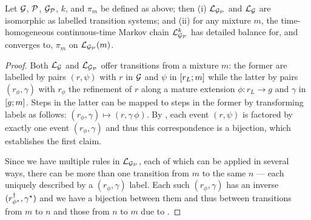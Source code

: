\begin{theorem}
  \label{thm:detailed-balance}
  Let $\mathcal{G}$, $\mathcal{P}$, $\mathcal{G}_{\mathcal{P}}$,
  $k$, and $\pi_m$ be defined as above;
  then (i) $\mathcal{L}_{\mathcal{G}_{\mathcal{P}}}$ and $\mathcal{L}_{\mathcal{G}}$ are isomorphic
  as labelled transition systems;
  and (ii) for any mixture $m$,
  the time-homogeneous continuous-time Markov chain
  $\mathcal{L}^k_{\mathcal{G}_{\mathcal{P}}}$ has detailed balance for, and converges to,
  $\pi_m$ on $\mathcal{L}_{\mathcal{G}_{\mathcal{P}}}(m)$.
\end{theorem}
\begin{proof}
  Both $\mathcal{L}_{\mathcal{G}}$ and $\mathcal{L}_{\mathcal{G}_{\mathcal{P}}}$
  offer transitions from a mixture $m$:
  the former are labelled by pairs $(r,\psi)$
  with $r$ in $\mathcal{G}$
  and $\psi$ in $\left[r_L;m\right]$
  while the latter by pairs $(r_\phi,\gamma)$
  with $r_\phi$ the refinement of $r$
  along a mature extension $\phi: r_L \to g$
  and $\gamma$ in $\left[g;m\right]$.
  Steps in the latter can be mapped to steps in the former
  by transforming labels as follows:
  $(r_\phi, \gamma) \mapsto (r, \gamma \, \phi)$.
  By , each event $(r,\psi)$ is factored by
  exactly one event $(r_\phi,\gamma)$ and thus
  this correspondence is a bijection,
  which establishes the first claim.


  Since we have multiple rules in $\mathcal{L}_{\mathcal{G}_{\mathcal{P}}}$,
  each of which can be applied in several ways,
  there can be more than one transition from $m$ to the same $n$ ---
  each uniquely described by a $(r_\phi,\gamma)$ label.
  Each such $(r_\phi,\gamma)$ has an inverse
  $(r^\dagger_{\phi^\star},\gamma^\star)$
  and we have a bijection between them and thus between
  transitions from $m$ to $n$ and those from $n$ to $m$
  due to .


\end{proof}
